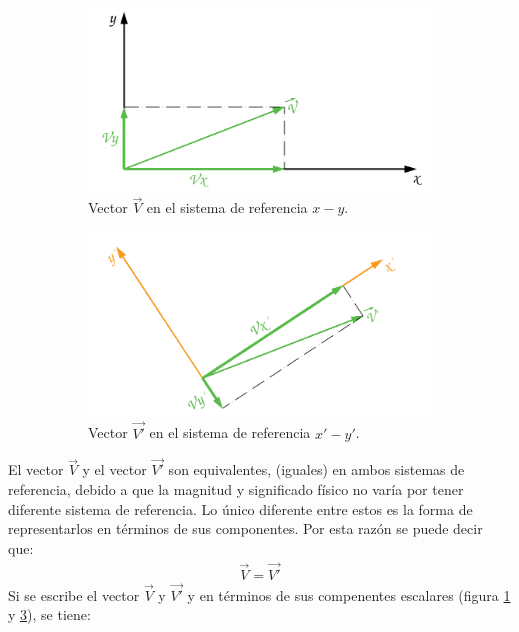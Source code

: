 \documentclass[12pt,letterpaper, twoside, openany]{article}
\begin{document}
\begin{figure}[H]

	\begin{subfigure}[l]{0.450\textwidth}
		\includegraphics[width=\textwidth]{img/Vector1Componentes.pdf}
		\caption{Vector $\overset{\rightarrow}{V}$ en el sistema de referencia $x-y$.}
		\label{vector1comp}
	\end{subfigure}
	\hspace{.5 cm}
	\begin{subfigure}[r]{0.450\textwidth}
		\includegraphics[width=\textwidth]{img/Vector2Componentes.pdf}
		\caption{Vector $\overset{\rightarrow}{V'}$ en el sistema de referencia $x'-y'$.}
		\label{vector2comp}
	\end{subfigure}	
	\caption{}
\end{figure}
%
%
El vector $\overset{\rightarrow}{V}$ y el vector $\overset{\rightarrow}{V'}$ son equivalentes, (iguales) en ambos sistemas de referencia, debido a que la magnitud y significado físico no varía por tener diferente sistema de referencia. Lo único diferente entre estos es la forma de representarlos en términos de sus componentes. Por esta razón se puede decir que:
%
\begin{align}
	\overset{\rightarrow}{V} = \overset{\rightarrow}{V'}
	\label{uno}
\end{align}
%
Si se escribe el vector $\overset{\rightarrow}{V}$  y  $\overset{\rightarrow}{V'}$ y en términos de sus compenentes escalares (figura \ref{vector1comp} y \ref{vector2comp}), se tiene: 
\end{document}
